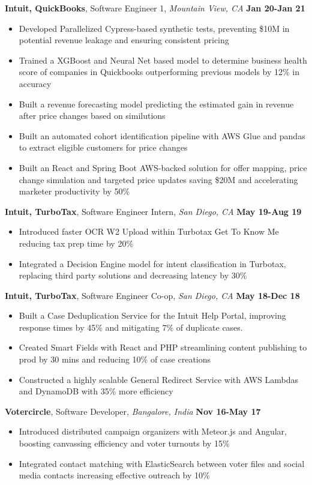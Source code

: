 \documentclass[10pt, letterpaper]{article}
\newcommand{\entry}[4]{
  \noindent\textbf{#1}, #2, \textit{#3} \hfill \textbf{#4}
}
\begin{document}
\entry{Intuit, QuickBooks}{Software Engineer 1}{Mountain View, CA}{Jan 20-Jan 21}
\begin{itemize}
	\item Developed Parallelized Cypress-based synthetic tests, preventing \$10M in potential revenue leakage and ensuring consistent pricing
	\item Trained a XGBoost and Neural Net based model to determine business health score of companies in Quickbooks outperforming previous models by 12\% in accuracy
	\item Built a revenue forecasting model predicting the estimated gain in revenue after price changes based on similutions
	\item Built an automated cohort identification pipeline with AWS Glue and pandas to extract eligible customers for price changes
	\item Built an React and Spring Boot AWS-backed solution for offer mapping, price change simulation and targeted price updates saving \$20M and accelerating marketer productivity by 50\%
\end{itemize}

\entry{Intuit, TurboTax}{Software Engineer Intern}{San Diego, CA}{May 19-Aug 19}
\begin{itemize}
	\item Introduced faster OCR W2 Upload within Turbotax Get To Know Me reducing tax prep time by 20\%
	\item Integrated a Decision Engine model for intent classification in Turbotax, replacing third party solutions and decreasing latency by 30\%
\end{itemize}

\entry{Intuit, TurboTax}{Software Engineer Co-op}{San Diego, CA}{May 18-Dec 18}
\begin{itemize}
	\item Built a Case Deduplication Service for the Intuit Help Portal, improving response times by 45\% and mitigating 7\% of duplicate cases.
	\item Created Smart Fields with React and PHP streamlining content publishing to prod by 30 mins and reducing 10\% of case creations
	\item Constructed a highly scalable General Redirect Service with AWS Lambdas and DynamoDB with 35\% more efficiency
\end{itemize}

\entry{Votercircle}{Software Developer}{Bangalore, India}{Nov 16-May 17}
\begin{itemize}
	\item Introduced distributed campaign organizers with Meteor.js and Angular, boosting canvassing efficiency and voter turnouts by 15\%
	\item Integrated contact matching with ElasticSearch between voter files and social media contacts increasing effective outreach by 10\%
\end{itemize}
\end{document}
